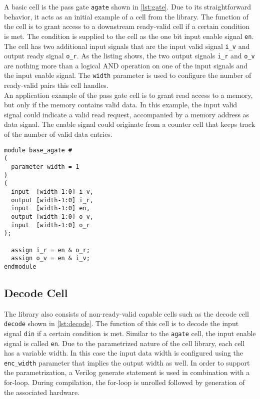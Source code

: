 A basic cell is the pass gate \texttt{agate} shown in \autoref{lst:gate}. Due to its straightforward behavior, it acts as an initial example of a cell from the library. The function of the cell is to grant access to a downstream ready-valid cell if a certain condition is met. The condition is supplied to the cell as the one bit input enable signal \texttt{en}. The cell has two additional input signals that are the input valid signal \texttt{i\_v} and output ready signal \texttt{o\_r}. As the listing shows, the two output signals \texttt{i\_r} and \texttt{o\_v} are nothing more than a logical AND operation on one of the input signals and the input enable signal. The \texttt{width} parameter is used to configure the number of ready-valid pairs this cell handles.\\
An application example of the pass gate cell is to grant read access to a memory, but only if the memory contains valid data. In this example, the input valid signal could indicate a valid read request, accompanied by a memory address as data signal. The enable signal could originate from a counter cell that keeps track of the number of valid data entries.

\begin{lstlisting}[style={verilog-style}, caption=Pass gate cell from the ready-valid cell library., label=lst:gate]
module base_agate #
(
  parameter width = 1
)
(
  input  [width-1:0] i_v,
  output [width-1:0] i_r,
  input  [width-1:0] en,
  output [width-1:0] o_v,
  input  [width-1:0] o_r
);

  assign i_r = en & o_r;
  assign o_v = en & i_v;
endmodule
\end{lstlisting}



\subsection{Decode Cell}
\label{sec:decode}
The library also consists of non-ready-valid capable cells such as the decode cell \texttt{decode} shown in \autoref{lst:decode}. The function of this cell is to decode the input signal \texttt{din} if a certain condition is met. Similar to the \texttt{agate} cell, the input enable signal is called \texttt{en}. Due to the parametrized nature of the cell library, each cell has a variable width. In this case the input data width is configured using the \texttt{enc\_width} parameter that implies the output width as well. In order to support the parametrization, a Verilog generate statement is used in combination with a for-loop. During compilation, the for-loop is unrolled followed by generation of the associated hardware.

